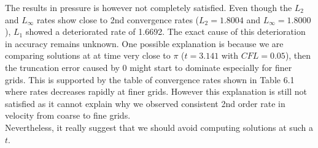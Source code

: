 The results in pressure is however not completely satisfied. Even though the $L_2$ and $L_\infty$ rates show close to 2nd convergence rates ($L_2 = 1.8004$ and $L_\infty = 1.8000$), $L_1$ showed a deteriorated rate of 1.6692. The exact cause of this deterioration in accuracy remains unknown. One possible explanation is because we are comparing solutions at at time very close to $\pi$ ($t = 3.141$ with $CFL = 0.05$), then the truncation error caused by 0 might start to dominate especially for finer grids. This is supported by the table of convergence rates shown in Table 6.1 where rates decreases rapidly at finer grids. However this explanation is still not satisfied as it cannot explain why we observed consistent 2nd order rate in velocity from coarse to fine grids.\\

Nevertheless, it really suggest that we should avoid computing solutions at such a $t$.

